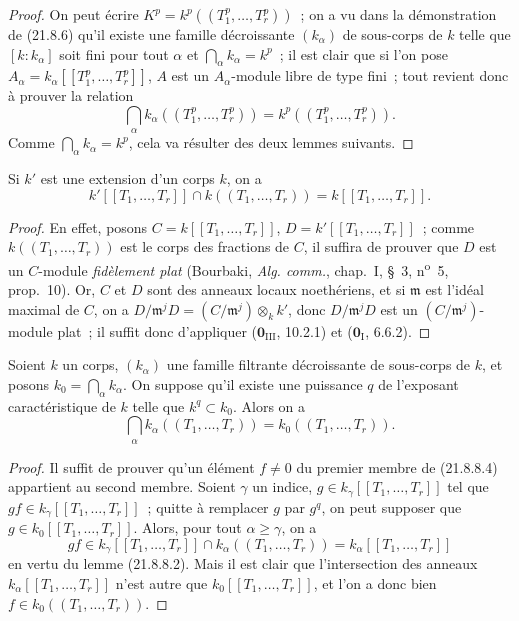 \begin{proof}
On peut écrire $K^p=k^p((T_1^p,\ldots,T_r^p))$~; on a vu dans la démonstration
de (21.8.6) qu'il existe une famille décroissante $(k_\alpha)$ de sous-corps
de $k$ telle que $[k:k_\alpha]$ soit fini pour tout $\alpha$ et
$\bigcap_\alpha k_\alpha=k^p$~; il est clair que si l'on pose
$A_\alpha=k_\alpha[[T_1^p,\ldots,T_r^p]]$, $A$ est un $A_\alpha$-module
libre de type fini~; tout revient donc à prouver la relation
\begin{equation}
\tag{21.8.8.1}
\label{0.21.8.8.1-fr}
  \bigcap_\alpha k_\alpha((T_1^p,\ldots,T_r^p))
  =k^p((T_1^p,\ldots,T_r^p)).
\end{equation}
Comme $\bigcap_\alpha k_\alpha=k^p$, cela va résulter des deux lemmes suivants.
\end{proof}

\begin{lemma}[21.8.8.2]
\label{0.21.8.8.2-fr}
Si $k'$ est une extension d'un corps $k$, on a
\[
  k'[[T_1,\ldots,T_r]]\cap k((T_1,\ldots,T_r))=k[[T_1,\ldots,T_r]].
\]
\end{lemma}

\begin{proof}
En effet, posons $C=k[[T_1,\ldots,T_r]]$, $D=k'[[T_1,\ldots,T_r]]$~; comme
$k((T_1,\ldots,T_r))$ est le corps des fractions de $C$, il suffira de
prouver que $D$ est un $C$-module \emph{fidèlement plat} (Bourbaki,
\emph{Alg. comm.}, chap.~I, \S~3, n\textsuperscript{o}~5, prop.~10). Or, $C$
et $D$ sont des anneaux locaux noethériens, et si $\mathfrak m$ est l'idéal
maximal de $C$, on a
$D/\mathfrak m^jD=(C/\mathfrak m^j)\otimes_k k'$, donc
$D/\mathfrak m^jD$ est un $(C/\mathfrak m^j)$-module plat~; il suffit donc
d'appliquer ($\mathbf 0_{\mathrm{III}}$, 10.2.1) et
($\mathbf 0_{\mathrm I}$, 6.6.2).
\end{proof}

\begin{lemma}[21.8.8.3]
\label{0.21.8.8.3-fr}
Soient $k$ un corps, $(k_\alpha)$ une famille filtrante décroissante de
sous-corps de $k$, et posons $k_0=\bigcap_\alpha k_\alpha$. On suppose qu'il
existe une puissance $q$ de l'exposant caractéristique de $k$ telle que
$k^q\subset k_0$. Alors on a
\begin{equation}
\tag{21.8.8.4}
\label{0.21.8.8.4-fr}
  \bigcap_\alpha k_\alpha((T_1,\ldots,T_r))=k_0((T_1,\ldots,T_r)).
\end{equation}
\end{lemma}

\begin{proof}
Il suffit de prouver qu'un élément $f\ne0$ du premier membre de (21.8.8.4)
appartient au second membre. Soient $\gamma$ un indice,
$g\in k_\gamma[[T_1,\ldots,T_r]]$ tel que
$gf\in k_\gamma[[T_1,\ldots,T_r]]$~; quitte à remplacer $g$ par $g^q$, on
peut supposer que $g\in k_0[[T_1,\ldots,T_r]]$. Alors, pour tout
$\alpha\geqslant\gamma$, on a
\[
  gf\in k_\gamma[[T_1,\ldots,T_r]]\cap k_\alpha((T_1,\ldots,T_r))
  =k_\alpha[[T_1,\ldots,T_r]]
\]
en vertu du lemme (21.8.8.2). Mais il est clair que l'intersection des
anneaux $k_\alpha[[T_1,\ldots,T_r]]$ n'est autre que
$k_0[[T_1,\ldots,T_r]]$, et l'on a donc bien
$f\in k_0((T_1,\ldots,T_r))$.
\end{proof}

